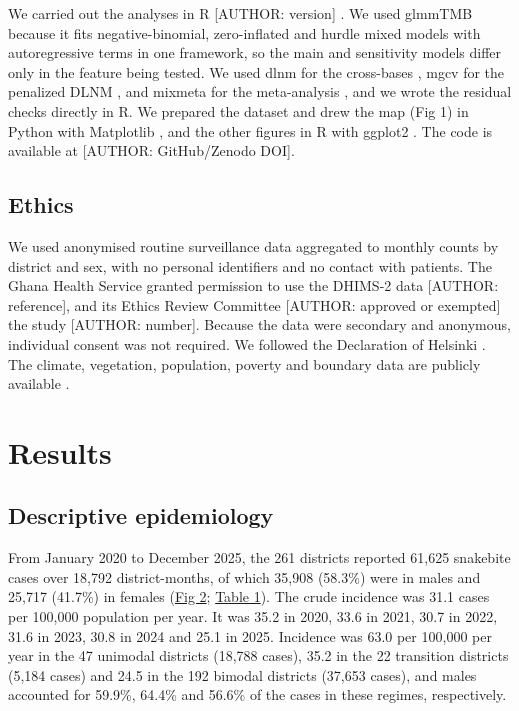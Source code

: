 \documentclass[11pt,a4paper]{article}
\begin{document}
We carried out the analyses in R {[}AUTHOR: version{]} \cite{ref50}. We used glmmTMB \cite{ref35} because it fits negative-binomial, zero-inflated and hurdle mixed models with autoregressive terms in one framework, so the main and sensitivity models differ only in the feature being tested. We used dlnm for the cross-bases \cite{ref36,ref51}, mgcv for the penalized DLNM \cite{ref52}, and mixmeta for the meta-analysis \cite{ref44}, and we wrote the residual checks directly in R. We prepared the dataset and drew the map (Fig 1) in Python with Matplotlib \cite{ref17}, and the other figures in R with ggplot2 \cite{ref53}. The code is available at {[}AUTHOR: GitHub/Zenodo DOI{]}.

\subsection{Ethics}

We used anonymised routine surveillance data aggregated to monthly counts by district and sex, with no personal identifiers and no contact with patients. The Ghana Health Service granted permission to use the DHIMS-2 data {[}AUTHOR: reference{]}, and its Ethics Review Committee {[}AUTHOR: approved or exempted{]} the study {[}AUTHOR: number{]}. Because the data were secondary and anonymous, individual consent was not required. We followed the Declaration of Helsinki \cite{ref54}. The climate, vegetation, population, poverty and boundary data are publicly available \cite{ref16,ref18,ref20,ref25}.

\section{Results}

\subsection{Descriptive epidemiology}

From January 2020 to December 2025, the 261 districts reported 61,625 snakebite cases over 18,792 district-months, of which 35,908 (58.3\%) were in males and 25,717 (41.7\%) in females (\hyperref[fig2]{Fig 2}; \hyperref[table1]{Table 1}). The crude incidence was 31.1 cases per 100,000 population per year. It was 35.2 in 2020, 33.6 in 2021, 30.7 in 2022, 31.6 in 2023, 30.8 in 2024 and 25.1 in 2025. Incidence was 63.0 per 100,000 per year in the 47 unimodal districts (18,788 cases), 35.2 in the 22 transition districts (5,184 cases) and 24.5 in the 192 bimodal districts (37,653 cases), and males accounted for 59.9\%, 64.4\% and 56.6\% of the cases in these regimes, respectively.
\end{document}
